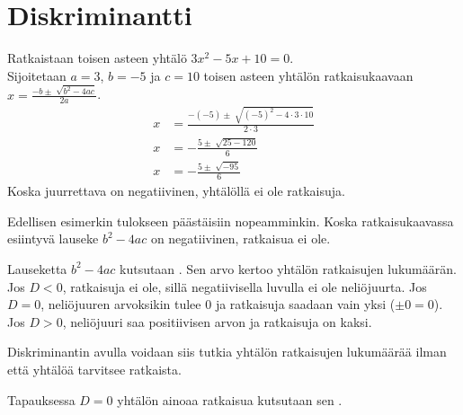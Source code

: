 \section{Diskriminantti}


\begin{esimerkki}
    Ratkaistaan toisen asteen yhtälö $3x^2-5x+10=0$.\\
    
    Sijoitetaan $a=3$, $b=-5$ ja $c=10$ toisen asteen yhtälön ratkaisukaavaan $x=\frac{-b \pm \sqrt[]{b^2-4ac}}{2a}$.
    \begin{align*}
        x &=\frac{-(-5) \pm \sqrt[]{(-5)^2-4\cdot 3 \cdot 10}}{2 \cdot 3} \\
        x &=-\frac{5 \pm \sqrt[]{25-120}}{6} \\
          x &=-\frac{5 \pm \sqrt[]{-95}}{6} 
    \end{align*}
    Koska juurrettava on negatiivinen, yhtälöllä ei ole ratkaisuja.
\end{esimerkki}

Edellisen esimerkin tulokseen päästäisiin nopeamminkin. Koska ratkaisukaavassa esiintyvä lauseke $b^2-4ac$ on negatiivinen, ratkaisua ei ole.

Lauseketta $b^2-4ac$ kutsutaan . Sen arvo kertoo yhtälön ratkaisujen lukumäärän. Jos $D<0$, ratkaisuja ei ole, sillä negatiivisella luvulla ei ole neliöjuurta. Jos $D=0$, neliöjuuren arvoksikin tulee $0$ ja ratkaisuja saadaan vain yksi ($\pm 0 = 0$). Jos $D>0$, neliöjuuri saa positiivisen arvon ja ratkaisuja on kaksi.

Diskriminantin avulla voidaan siis tutkia yhtälön ratkaisujen lukumäärää ilman että yhtälöä tarvitsee ratkaista.

\newpage
{}
Tapauksessa $D=0$ yhtälön ainoaa ratkaisua kutsutaan sen .

